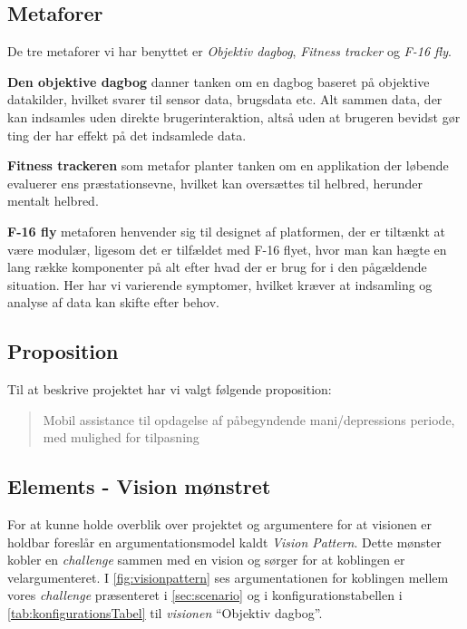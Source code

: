 \subsection{Metaforer}
De tre metaforer vi har benyttet er \textit{Objektiv dagbog}, \textit{Fitness tracker} og \textit{F-16 fly}.

\textbf{Den objektive dagbog} danner tanken om en dagbog baseret på objektive datakilder, hvilket svarer til sensor data, brugsdata etc.
Alt sammen data, der kan indsamles uden direkte brugerinteraktion, altså uden at brugeren bevidst gør ting der har effekt på det indsamlede data.

\textbf{Fitness trackeren} som metafor planter tanken om en applikation der løbende evaluerer ens præstationsevne, hvilket kan oversættes til helbred, herunder mentalt helbred.

\textbf{F-16 fly}\label{vision::fly} metaforen henvender sig til designet af platformen, der er tiltænkt at være modulær, ligesom det er tilfældet med F-16 flyet, hvor man kan hægte en lang række komponenter på alt efter hvad der er brug for i den pågældende situation.
Her har vi varierende symptomer, hvilket kræver at indsamling og analyse af data kan skifte efter behov.

\subsection{Proposition}
Til at beskrive projektet har vi valgt følgende proposition:
\begin{quote}
	Mobil assistance til opdagelse af påbegyndende mani/depressions periode, med mulighed for tilpasning
\end{quote}

\subsection{Elements - Vision mønstret}
For at kunne holde overblik over projektet og argumentere for at visionen er holdbar foreslår \citet[Kapitel 15 - Project]{art:essence} en argumentationsmodel kaldt \emph{Vision Pattern}. 
Dette mønster kobler en \emph{challenge} sammen med en vision og sørger for at koblingen er velargumenteret.
I \cref{fig:visionpattern} ses argumentationen for koblingen mellem vores \textit{challenge} præsenteret i \cref{sec:scenario} og i konfigurationstabellen i \cref{tab:konfigurationsTabel} til \textit{visionen} ``Objektiv dagbog''.

